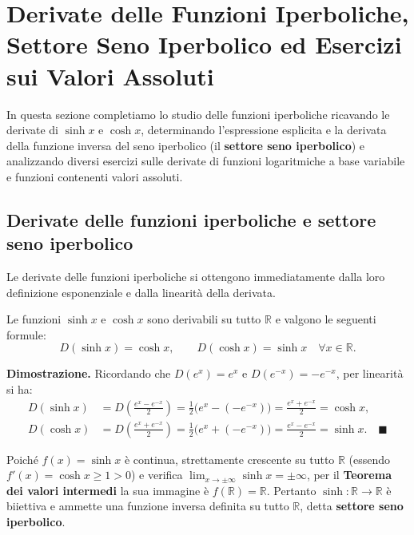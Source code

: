 \section{Derivate delle Funzioni Iperboliche, Settore Seno Iperbolico ed Esercizi sui Valori Assoluti}

In questa sezione completiamo lo studio delle funzioni iperboliche ricavando le derivate di $\sinh x$ e $\cosh x$, determinando l'espressione esplicita e la derivata della funzione inversa del seno iperbolico (il \textbf{settore seno iperbolico}) e analizzando diversi esercizi sulle derivate di funzioni logaritmiche a base variabile e funzioni contenenti valori assoluti.

\subsection{Derivate delle funzioni iperboliche e settore seno iperbolico}

Le derivate delle funzioni iperboliche si ottengono immediatamente dalla loro definizione esponenziale e dalla linearità della derivata.

\begin{propbox}
Le funzioni $\sinh x$ e $\cosh x$ sono derivabili su tutto $\mathbb{R}$ e valgono le seguenti formule:
\[
    D(\sinh x) = \cosh x, \qquad D(\cosh x) = \sinh x \quad \forall x \in \mathbb{R}.
\]
\end{propbox}

\noindent\textbf{Dimostrazione.} Ricordando che $D(e^x) = e^x$ e $D(e^{-x}) = -e^{-x}$, per linearità si ha:
\begin{align*}
    D(\sinh x) &= D\!\left(\frac{e^x - e^{-x}}{2}\right) = \frac{1}{2}\bigl(e^x - (-e^{-x})\bigr) = \frac{e^x + e^{-x}}{2} = \cosh x, \\
    D(\cosh x) &= D\!\left(\frac{e^x + e^{-x}}{2}\right) = \frac{1}{2}\bigl(e^x + (-e^{-x})\bigr) = \frac{e^x - e^{-x}}{2} = \sinh x. \quad \blacksquare
\end{align*}

Poiché $f(x) = \sinh x$ è continua, strettamente crescente su tutto $\mathbb{R}$ (essendo $f'(x) = \cosh x \ge 1 > 0$) e verifica $\lim_{x \to \pm\infty} \sinh x = \pm\infty$, per il \textbf{Teorema dei valori intermedi} la sua immagine è $f(\mathbb{R}) = \mathbb{R}$. Pertanto $\sinh \colon \mathbb{R} \to \mathbb{R}$ è biiettiva e ammette una funzione inversa definita su tutto $\mathbb{R}$, detta \textbf{settore seno iperbolico}.

